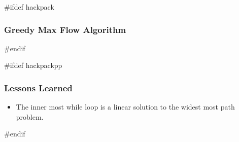#ifdef hackpack
\subsubsection{Greedy Max Flow Algorithm}
#endif

#ifdef hackpackpp
\subsubsection{Lessons Learned}
\begin{itemize}
	\item The inner most while loop is a linear solution to the widest most path problem.
\end{itemize}
#endif

